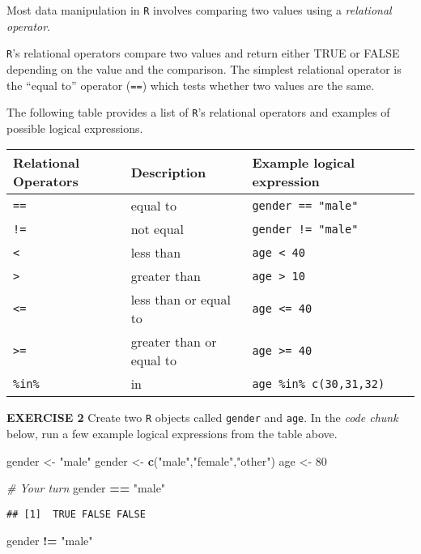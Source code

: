 \documentclass[
]{article}
\newenvironment{Shaded}{\begin{snugshade}}{\end{snugshade}}
\newcommand{\CommentTok}[1]{\textcolor[rgb]{0.56,0.35,0.01}{\textit{#1}}}
\newcommand{\DecValTok}[1]{\textcolor[rgb]{0.00,0.00,0.81}{#1}}
\newcommand{\KeywordTok}[1]{\textcolor[rgb]{0.13,0.29,0.53}{\textbf{#1}}}
\newcommand{\NormalTok}[1]{#1}
\newcommand{\OperatorTok}[1]{\textcolor[rgb]{0.81,0.36,0.00}{\textbf{#1}}}
\newcommand{\StringTok}[1]{\textcolor[rgb]{0.31,0.60,0.02}{#1}}
\begin{document}
Most data manipulation in \texttt{R} involves comparing two values using
a \emph{relational operator}.

\texttt{R}'s relational operators compare two values and return either
TRUE or FALSE depending on the value and the comparison. The simplest
relational operator is the ``equal to'' operator (\texttt{==}) which
tests whether two values are the same.

The following table provides a list of \texttt{R}'s relational operators
and examples of possible logical expressions.

\begin{longtable}[]{@{}lll@{}}
\toprule
Relational Operators & Description & Example logical
expression\tabularnewline
\midrule
\endhead
\texttt{==} & equal to & \texttt{gender\ ==\ "male"}\tabularnewline
\texttt{!=} & not equal & \texttt{gender\ !=\ "male"}\tabularnewline
\texttt{\textless{}} & less than &
\texttt{age\ \textless{}\ 40}\tabularnewline
\texttt{\textgreater{}} & greater than &
\texttt{age\ \textgreater{}\ 10}\tabularnewline
\texttt{\textless{}=} & less than or equal to &
\texttt{age\ \textless{}=\ 40}\tabularnewline
\texttt{\textgreater{}=} & greater than or equal to &
\texttt{age\ \textgreater{}=\ 40}\tabularnewline
\texttt{\%in\%} & in & \texttt{age\ \%in\%\ c(30,31,32)}\tabularnewline
\bottomrule
\end{longtable}

\textbf{EXERCISE 2} Create two \texttt{R} objects called \texttt{gender}
and \texttt{age}. In the \emph{code chunk} below, run a few example
logical expressions from the table above.

\begin{Shaded}
\begin{Highlighting}[]
\NormalTok{gender <-}\StringTok{ "male"}
\NormalTok{gender <-}\StringTok{ }\KeywordTok{c}\NormalTok{(}\StringTok{"male"}\NormalTok{,}\StringTok{"female"}\NormalTok{,}\StringTok{"other"}\NormalTok{)}
\NormalTok{age <-}\StringTok{ }\DecValTok{80}

\CommentTok{# Your turn}
\NormalTok{gender }\OperatorTok{==}\StringTok{ "male"}
\end{Highlighting}
\end{Shaded}

\begin{verbatim}
## [1]  TRUE FALSE FALSE
\end{verbatim}

\begin{Shaded}
\begin{Highlighting}[]
\NormalTok{gender }\OperatorTok{!=}\StringTok{ "male"}
\end{Highlighting}
\end{Shaded}
\end{document}
